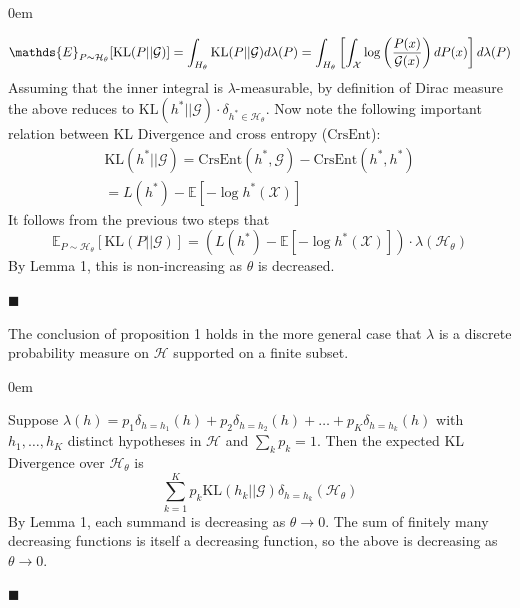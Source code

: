 \documentclass[12pt]{article}
\renewcommand{\qed}{\hfill$\blacksquare$}
\renewenvironment{proof}{\begin{addmargin}[1em]{0em}\begin{newproof}}{\end{newproof}\end{addmargin}\qed}
\newenvironment{proposition}[2][Proposition]{\begin{trivlist}
\item[\hskip \labelsep {\bfseries #1}\hskip \labelsep {\bfseries #2.}]}{\end{trivlist}}
\begin{document}
\begin{proof}
    \begin{equation*}
        \mathds{E}_{P \sim \mathcal{H}_\theta}[\text{KL}(P || \mathcal{G})] = \int_{H_\theta} \text{KL}(P||\mathcal{G}) d\lambda(P) \\
        = \int_{H_\theta} \left[ \int_\mathcal{X} \log\left(\frac{P(x)}{\mathcal{G}(x)}\right) dP(x)\right] d\lambda(P)
    \end{equation*}
    Assuming that the inner integral is $\lambda$-measurable, by definition of Dirac measure the above reduces to $\text{KL}(h^* || \mathcal{G}) \cdot \delta_{h^* \in \mathcal{H}_\theta}$. Now note the following important relation between KL Divergence and cross entropy ($\text{CrsEnt}$):
    \begin{gather*}
        \text{KL}(h^* || \mathcal{G}) = \text{CrsEnt}(h^*,\mathcal{G}) - \text{CrsEnt}(h^*,h^*) \\
        = L(h^*) - \mathds{E}[-\log h^*(\mathcal{X})]
    \end{gather*}
    It follows from the previous two steps that
    \begin{equation*}
        \mathds{E}_{P \sim \mathcal{H}_\theta}[\text{KL}(P || \mathcal{G})] = (L(h^*) - \mathds{E}[-\log h^*(\mathcal{X})])\cdot \lambda(\mathcal{H}_\theta)
    \end{equation*}
    By Lemma 1, this is non-increasing as $\theta$ is decreased.
    
\end{proof}


\begin{proposition}{2}
    The conclusion of proposition 1 holds in the more general case that $\lambda$ is a discrete probability measure   on $\mathcal{H}$ supported on a finite subset. 
\end{proposition}

\begin{proof}
    Suppose $\lambda(h) = p_1 \delta_{h=h_1}(h) + p_2 \delta_{h=h_2}(h) + \ldots + p_K \delta_{h=h_k}(h)$ with $h_1,\ldots,h_K$ distinct hypotheses in $\mathcal{H}$ and $\sum_k p_k=1$. Then the expected KL Divergence over $\mathcal{H}_\theta$ is 
    \begin{equation*}
        \sum_{k=1}^K p_k \text{KL}(h_k || \mathcal{G}) \delta_{h=h_k}(\mathcal{H}_\theta)
    \end{equation*}
    By Lemma 1, each summand is decreasing as $\theta \rightarrow 0$. The sum of finitely many decreasing functions is itself a decreasing function, so the above is decreasing as $\theta \rightarrow 0$. 
\end{proof}
\end{document}
